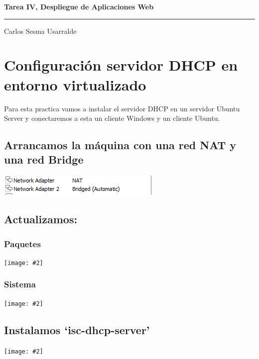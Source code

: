 \documentclass[a4paper,12pt]{article} %
\newcommand{\image}[2][1]{\texttt{[image: \#2]}}
\newcommand{\Nombre}{Carlos Sesma Usarralde}
\newcommand{\Proyecto}{Tarea IV, Despliegue de Aplicaciones Web}
\begin{document}
\cfoot{\thepage}
\begin{titlepage}
    \begin{center}
        \huge\textbf{\Proyecto}
    \end{center}
    \hfill{}
    {\color{acentColor}\hrule}
    \vfill{}
    \begin{center}
    \end{center}
    \vfill{}
    \begin{center}
        {\large{} \Nombre}
    \end{center}
\end{titlepage}
\clearpage{}
\tableofcontents{}
\thispagestyle{empty}
\clearpage{}
\section{Configuración servidor DHCP en entorno virtualizado}

Para esta practica vamos a instalar el servidor DHCP en un servidor Ubuntu Server y conectaremos a esta un cliente Windows y un cliente Ubuntu.


\subsection{Arrancamos la máquina con una red NAT y una red Bridge}

\includegraphics{00.png}


\subsection{Actualizamos:}
\subsubsection{Paquetes}

\image[1]{01.png}
\subsubsection{Sistema}

\image{02.png}

\subsection{Instalamos `isc-dhcp-server'}
\image{03.png}
\end{document}
